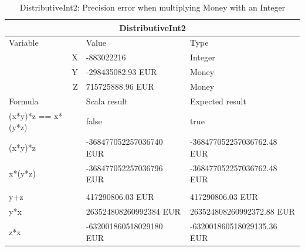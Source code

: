 \begin{table}[h!]
\centering
\begin{tabular}{|lll|}
\hline
\multicolumn{3}{|c|}{DistributiveInt2}                                                                              \\ \hline
\multicolumn{1}{|l}{Variable}           & Value                   & \multicolumn{1}{l|}{Type}                       \\
\multicolumn{1}{|r}{X}                  & -883022216              & \multicolumn{1}{l|}{Integer}                    \\
\multicolumn{1}{|r}{Y}                  & -298435082.93 EUR       & \multicolumn{1}{l|}{Money}                      \\
\multicolumn{1}{|r}{Z}                  & 715725888.96 EUR        & \multicolumn{1}{l|}{Money}                      \\ \hline
\multicolumn{1}{|l}{Formula}            & Scala result            & \multicolumn{1}{l|}{Expected result}            \\
\multicolumn{1}{|l}{(x*y)*z == x*(y*z)} & false                   & \multicolumn{1}{l|}{true}                       \\
\multicolumn{1}{|l}{(x*y)*z}            & -368477052257036740 EUR & \multicolumn{1}{l|}{-368477052257036762.48 EUR} \\
\multicolumn{1}{|l}{x*(y*z)}            & -368477052257036796 EUR & \multicolumn{1}{l|}{-368477052257036762.48 EUR} \\
\multicolumn{1}{|l}{}                   &                         & \multicolumn{1}{l|}{}                           \\
\multicolumn{1}{|l}{y+z}                & 417290806.03 EUR        & \multicolumn{1}{l|}{417290806.03 EUR}           \\
\multicolumn{1}{|l}{y*x}                & 263524808260992384 EUR  & \multicolumn{1}{l|}{263524808260992372.88 EUR}  \\
\multicolumn{1}{|l}{z*x}                & -632001860518029180 EUR & \multicolumn{1}{l|}{-632001860518029135.36 EUR} \\ \hline
\end{tabular}
\caption{DistributiveInt2: Precision error when multiplying Money with an Integer}
\label{ch4_init_check_DistributiveInt2}
\end{table}
\\

